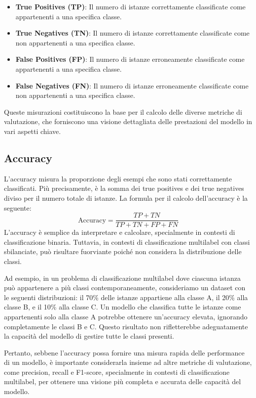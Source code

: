 \documentclass[../../Thesis.tex]{subfiles}
\begin{document}
\begin{itemize}
\item \textbf{True Positives (TP)}: Il numero di istanze correttamente classificate come appartenenti a una specifica classe.
\item \textbf{True Negatives (TN)}: Il numero di istanze correttamente classificate come non appartenenti a una specifica classe.
\item \textbf{False Positives (FP)}: Il numero di istanze erroneamente classificate come appartenenti a una specifica classe.
\item \textbf{False Negatives (FN)}: Il numero di istanze erroneamente classificate come non appartenenti a una specifica classe.
\end{itemize}

Queste misurazioni costituiscono la base per il calcolo delle diverse metriche di valutazione, che forniscono una visione dettagliata delle prestazioni del modello in vari aspetti chiave.

\subsection{Accuracy}
L'accuracy misura la proporzione degli esempi che sono stati correttamente classificati. Più precisamente, è la somma dei true positives e dei true negatives diviso per il numero totale di istanze. La formula per il calcolo dell'accuracy è la seguente:
$$ \text{Accuracy} = \frac{TP + TN}{TP + TN + FP + FN} $$
L'accuracy è semplice da interpretare e calcolare, specialmente in contesti di classificazione binaria. Tuttavia, in contesti di classificazione multilabel con classi sbilanciate, può risultare fuorviante poiché non considera la distribuzione delle classi.

Ad esempio, in un problema di classificazione multilabel dove ciascuna istanza può appartenere a più classi contemporaneamente, consideriamo un dataset con le seguenti distribuzioni: il 70\% delle istanze appartiene alla classe A, il 20\% alla classe B, e il 10\% alla classe C. Un modello che classifica tutte le istanze come appartenenti solo alla classe A potrebbe ottenere un'accuracy elevata, ignorando completamente le classi B e C. Questo risultato non rifletterebbe adeguatamente la capacità del modello di gestire tutte le classi presenti. 

Pertanto, sebbene l'accuracy possa fornire una misura rapida delle performance di un modello, è importante considerarla insieme ad altre metriche di valutazione, come precision, recall e F1-score, specialmente in contesti di classificazione multilabel, per ottenere una visione più completa e accurata delle capacità del modello.
\end{document}
